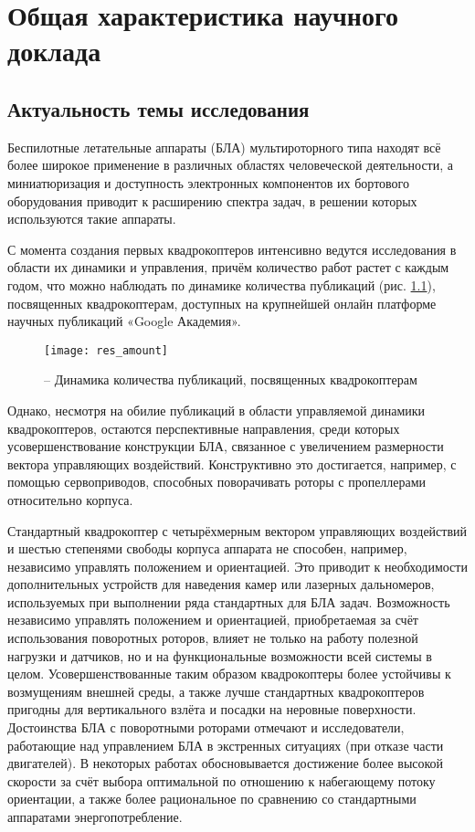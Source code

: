 
\chapter{Общая характеристика научного доклада}

\section{Актуальность темы исследования}

Беспилотные летательные аппараты (БЛА) мультироторного типа находят всё более широкое применение в различных областях человеческой деятельности, а миниатюризация и доступность электронных компонентов их бортового оборудования приводит к расширению спектра задач, в решении которых используются такие аппараты.

С момента создания первых квадрокоптеров интенсивно ведутся исследования в области их динамики и управления, причём количество работ растет с каждым годом, что можно наблюдать по динамике количества публикаций (рис. \ref{pic:res_amount}), посвященных квадрокоптерам, доступных на крупнейшей онлайн платформе научных публикаций «Google Академия».

\begin{figure}[h!]
	\centering
	\texttt{[image: res\_amount]}
	\caption{ -- Динамика количества публикаций, посвященных квадрокоптерам}
	\label{pic:res_amount}
\end{figure}

Однако, несмотря на обилие публикаций в области управляемой динамики квадрокоптеров, остаются перспективные направления, среди которых усовершенствование конструкции БЛА, связанное с увеличением размерности вектора управляющих воздействий.
Конструктивно это достигается, например, с помощью сервоприводов, способных поворачивать роторы с пропеллерами относительно корпуса.

Стандартный квадрокоптер с четырёхмерным вектором управляющих воздействий и шестью степенями свободы корпуса аппарата не способен, например, независимо управлять положением и ориентацией.
Это приводит к необходимости дополнительных устройств для наведения камер или лазерных дальномеров, используемых при выполнении ряда стандартных для БЛА задач.
Возможность независимо управлять положением и ориентацией, приобретаемая за счёт использования поворотных роторов, влияет не только на работу полезной нагрузки и датчиков, но и на функциональные возможности всей системы в целом.
Усовершенствованные таким образом квадрокоптеры более устойчивы к возмущениям внешней среды, а также лучше стандартных квадрокоптеров пригодны для вертикального взлёта и посадки на неровные поверхности.
Достоинства БЛА с поворотными роторами отмечают и исследователи, работающие над управлением БЛА в экстренных ситуациях (при отказе части двигателей).
В некоторых работах обосновывается достижение более высокой скорости за счёт выбора оптимальной по отношению к набегающему потоку ориентации, а также более рациональное по сравнению со стандартными аппаратами энергопотребление.

